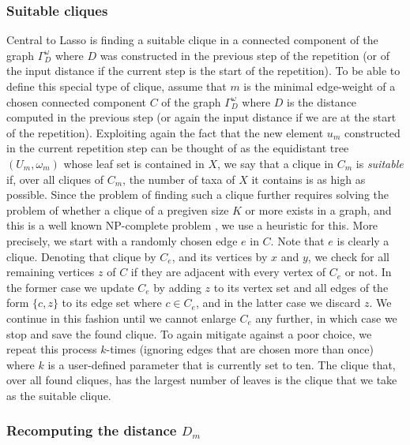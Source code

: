 \subsubsection{Suitable cliques}
\label{sec:cliques}
Central to {\sc Lasso} is finding a suitable clique in a connected component
of the graph $\Gamma^{\omega}_D$ where $D$ was constructed in the previous
step of the repetition (or of the input distance if the current step is the
start of the repetition). To be able to define this special type of clique,
assume that $m$ is the minimal edge-weight of a chosen connected component $C$
of the graph $\Gamma^{\omega}_D$ where $D$ is the distance computed in the
previous step (or again the input distance if we are at the start of the
repetition). Exploiting again the fact that the new element $u_m$ constructed
in the current repetition step can be thought of as the equidistant tree
$(U_m,\omega_m)$ whose leaf set is contained in $X$, we say that a clique in
$C_m$ is {\em suitable} if, over all cliques of $C_m$, the number of taxa of
$X$ it contains is as high as possible. Since the problem of finding such a
clique further requires solving the problem of whether a clique of a pregiven
size $K$ or more exists in a graph, and this is a well known NP-complete
problem \cite{gareyjohnson79}, we use a heuristic for this. More precisely, we
start with a randomly chosen edge $e$ in $C$. Note that $e$ is clearly a
clique. Denoting that clique by $C_e$, and its vertices by $x$ and $y$, we
check for all remaining vertices $z$ of $C$ if they are adjacent with every
vertex of $C_e$ or not. In the former case we update $C_e$ by adding $z$ to
its vertex set and all edges of the form $\{c,z\}$ to its edge set where $c\in
C_e$, and in the latter case we discard $z$.  We continue in this fashion
until we cannot enlarge $C_e$ any further, in which case we stop and save the
found clique. To again mitigate against a poor choice, we repeat this process
$k$-times (ignoring edges that are chosen more than once) where $k$ is a
user-defined parameter that is currently set to ten. The clique that, over all
found cliques, has the largest number of leaves is the clique that we take as
the suitable clique.

\subsubsection{Recomputing the distance $D_m$}
\label{sec:collapsinng-edges}

